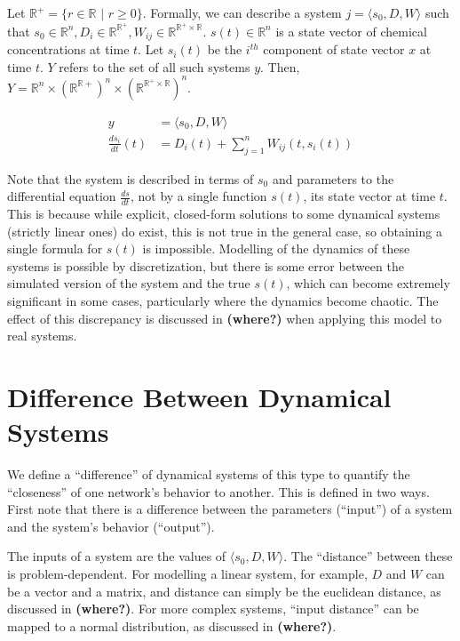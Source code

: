 \documentclass{article}
\begin{document}
Let $\mathbb{R}^+ = \{r \in \mathbb{R} \,\,|\,\, r \ge 0\}$. Formally, we can describe a system $j = \langle s_0, D, W \rangle$ such that $s_0 \in \mathbb{R}^n, D_i \in \mathbb{R}^{\mathbb{R}^+}, W_{ij} \in \mathbb{R}^{\mathbb{R}^+ \times \mathbb{R}}$. $s(t) \in \mathbb{R}^n$ is a state vector of chemical concentrations at time $t$. Let $s_i(t)$ be the $i^{th}$ component of state vector $x$ at time $t$. $Y$ refers to the set of all such systems $y$. Then, $Y = \mathbb{R}^n \times (\mathbb{R}^{\mathbb{R}+})^n \times (\mathbb{R}^{\mathbb{R}^+ \times \mathbb{R}})^n$.

\begin{align}
  y &= \langle s_0, D, W \rangle \label{system-defn} \\
  \frac{ds_i}{dt}(t) &= D_i(t) + \sum_{j = 1}^n W_{ij}(t, s_i(t)) \label{system-diffeq}
\end{align}

Note that the system is described in terms of $s_0$ and parameters to the differential equation $\frac{ds}{dt}$, not by a single function $s(t)$, its state vector at time $t$. This is because while explicit, closed-form solutions to some dynamical systems (strictly linear ones) do exist, this is not true in the general case, so obtaining a single formula for $s(t)$ is impossible. Modelling of the dynamics of these systems is possible by discretization, but there is some error between the simulated version of the system and the true $s(t)$, which can become extremely significant in some cases, particularly where the dynamics become chaotic. The effect of this discrepancy is discussed in \textbf{(where?)} when applying this model to real systems.

\section{Difference Between Dynamical Systems} \label{similarity}
We define a ``difference'' of dynamical systems of this type to quantify the ``closeness'' of one network's behavior to another. This is defined in two ways. First note that there is a difference between the parameters (``input'') of a system and the system's behavior (``output'').

The inputs of a system are the values of $\langle s_0, D, W \rangle$. The ``distance'' between these is problem-dependent. For modelling a linear system, for example, $D$ and $W$ can be a vector and a matrix, and distance can simply be the euclidean distance, as discussed in \textbf{(where?)}. For more complex systems, ``input distance'' can be mapped to a normal distribution, as discussed in \textbf{(where?)}.
\end{document}
